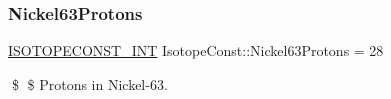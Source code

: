 \subsubsection{\texorpdfstring{Nickel63\+Protons}{Nickel63Protons}}
{\footnotesize\ttfamily \mbox{\hyperlink{group___isotope_const-_macros_ga5f18360b3e99483a35c32d789e62621c}{I\+S\+O\+T\+O\+P\+E\+C\+O\+N\+S\+T\+\_\+\+I\+NT}} Isotope\+Const\+::\+Nickel63\+Protons = 28}

\$ \$ Protons in Nickel-\/63. 